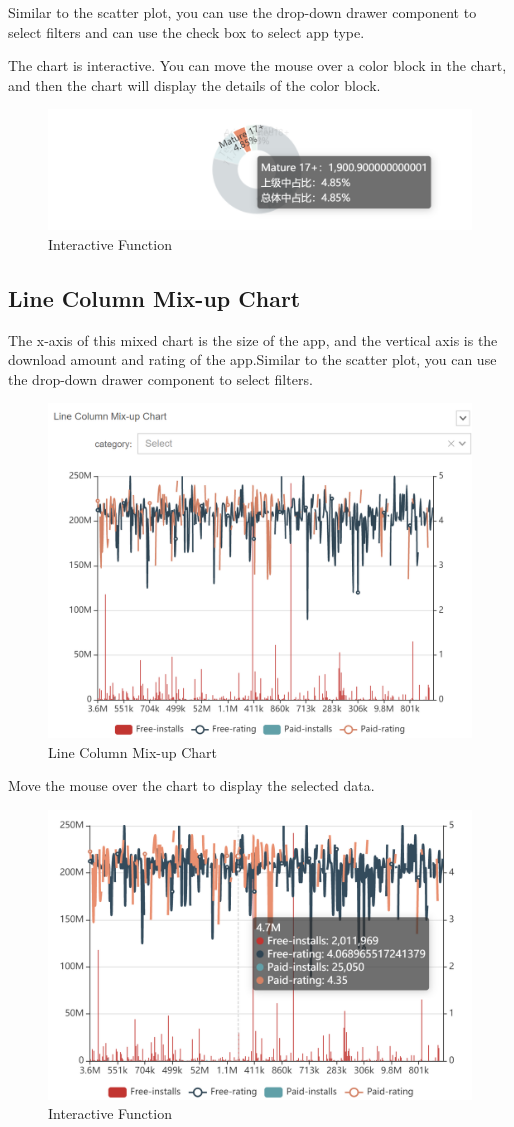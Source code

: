 \documentclass{hci}
\begin{document}
Similar to the scatter plot, you can use the drop-down drawer component to select filters and can use the check box to select app type.

The chart is interactive. You can move the mouse over a color block in the chart, and then the chart will display the details of the color block.
\begin{figure}[htbp]
	\centering
	\includegraphics[width=0.7\linewidth]{figures/inter}
	\caption{Interactive Function}
	\label{fig:InterChart}
\end{figure}

\subsection{Line Column Mix-up Chart}
The x-axis of this mixed chart is the size of the app, and the vertical axis is the download amount and rating of the app.Similar to the scatter plot, you can use the drop-down drawer component to select filters.
\begin{figure}[htbp]
	\centering
	\includegraphics[width=0.7\linewidth]{figures/LineColumnMix-upChart}
	\caption{Line Column Mix-up Chart}
	\label{fig:Line Column Mix-up Chart}
\end{figure}

Move the mouse over the chart to display the selected data.
\begin{figure}[htbp]
	\centering
	\includegraphics[width=0.7\linewidth]{figures/inter1}
	\caption{Interactive Function}
	\label{fig:inter}
\end{figure}
\end{document}
